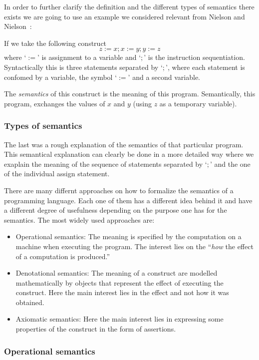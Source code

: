 In order to further clarify the definition and the different types of semantics there exists we are going to use an example we considered relevant from Nielson and Nielson~\parencite{nielson}:

If we take the following construct
\begin{equation*}
z:=x; x:=y; y:=z
\end{equation*}
where `$:=$' is assignment to a variable and `$;$' is the instruction sequentiation.
Syntactically this is three statements separated by `$;$', where each statement is confomed by a variable, the symbol `$:=$' and a second variable.

The \textit{semantics} of this construct is the meaning of this program.
Semantically, this program, exchanges the values of $x$ and $y$ (using $z$ as a temporary variable).

\subsubsection{Types of semantics}

The last was a rough explanation of the semantics of that particular program.
This semantical explanation can clearly be done in a more detailed way where we exaplain the meaning of the sequence of statements separated by `$;$' and the one of the individual assign statement.

There are many differnt approaches on how to formalize the semantics of a programming language.
Each one of them has a different idea behind it and have a different degree of usefulness depending on the purpose one has for the semantics.
The most widely used approaches are:

\begin{itemize}
\item{Operational semantics:}
The meaning is specified by the computation on a machine when executing the program.
The interest lies on the ``\textit{how} the effect of a computation is produced.''~\parencite{nielson}
\item{Denotational semantics:}
The meaning of a construct are modelled mathematically by objects that represent the effect of executing the construct.
Here the main interest lies in the effect and not how it was obtained.
\item{Axiomatic semantics:}
Here the main interest lies in expressing some properties of the construct in the form of assertions.
\end{itemize}

\subsubsection{Operational semantics}

